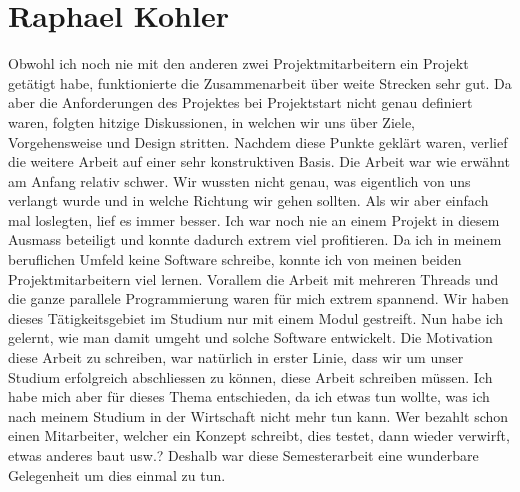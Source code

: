 \section{Raphael Kohler}
Obwohl ich noch nie mit den anderen zwei Projektmitarbeitern ein Projekt getätigt habe, funktionierte die Zusammenarbeit über weite Strecken sehr gut. Da aber die Anforderungen des Projektes bei Projektstart nicht genau definiert waren, folgten hitzige Diskussionen, in welchen wir uns über Ziele, Vorgehensweise und Design stritten. Nachdem diese Punkte geklärt waren, verlief die weitere Arbeit auf einer sehr konstruktiven Basis. \newline
Die Arbeit war wie erwähnt am Anfang relativ schwer. Wir wussten nicht genau, was eigentlich von uns verlangt wurde und in welche Richtung wir gehen sollten. Als wir aber einfach mal loslegten, lief es immer besser. Ich war noch nie an einem Projekt in diesem Ausmass beteiligt und konnte dadurch extrem viel profitieren. Da ich in meinem beruflichen Umfeld keine Software schreibe, konnte ich von meinen beiden Projektmitarbeitern viel lernen. \newline
Vorallem die Arbeit mit mehreren Threads und die ganze parallele Programmierung waren für mich extrem spannend. Wir haben dieses Tätigkeitsgebiet im Studium nur mit einem Modul gestreift. Nun habe ich gelernt, wie man damit umgeht und solche Software entwickelt. \newline
Die Motivation diese Arbeit zu schreiben, war natürlich in erster Linie, dass wir um unser Studium erfolgreich abschliessen zu können, diese Arbeit schreiben müssen. Ich habe mich aber für dieses Thema entschieden, da ich etwas tun wollte, was ich nach meinem Studium in der Wirtschaft nicht mehr tun kann. Wer bezahlt schon einen Mitarbeiter, welcher ein Konzept schreibt, dies testet, dann wieder verwirft, etwas anderes baut usw.? Deshalb war diese Semesterarbeit eine wunderbare Gelegenheit um dies einmal zu tun.

